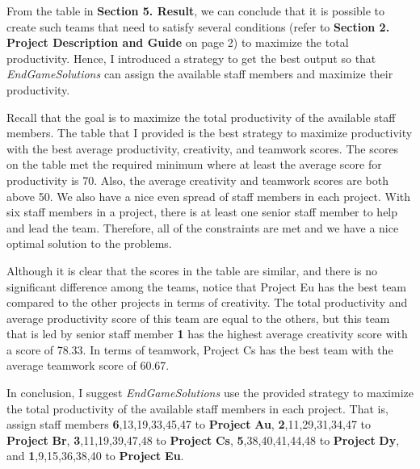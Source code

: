 \documentclass{article}
\begin{document}
From the table in \textbf{Section 5. Result}, we can conclude that it is possible to create such teams that need to satisfy several conditions (refer to \textbf{Section 2. Project Description and Guide} on page 2) to maximize the total productivity. Hence, I introduced a strategy to get the best output so that \textit{EndGameSolutions} can assign the available staff members and maximize their productivity.

Recall that the goal is to maximize the total productivity of the available staff members. The table that I provided is the best strategy to maximize productivity with the best average productivity, creativity, and teamwork scores. The scores on the table met the required minimum where at least the average score for productivity is 70. Also, the average creativity and teamwork scores are both above 50. We also have a nice even spread of staff members in each project. With six staff members in a project, there is at least one senior staff member to help and lead the team. Therefore, all of the constraints are met and we have a nice optimal solution to the problems.

Although it is clear that the scores in the table are similar, and there is no significant difference among the teams, notice that Project Eu has the best team compared to the other projects in terms of creativity. The total productivity and average productivity score of this team are equal to the others, but this team that is led by senior staff member \textbf{1} has the highest average creativity score with a score of 78.33. In terms of teamwork, Project Cs has the best team with the average teamwork score of 60.67.

In conclusion, I suggest \textit{EndGameSolutions} use the provided strategy to maximize the total productivity of the available staff members in each project. That is, assign staff members \textbf{6},13,19,33,45,47 to \textbf{Project} \textbf{Au}, \textbf{2},11,29,31,34,47 to \textbf{Project} \textbf{Br}, \textbf{3},11,19,39,47,48 to \textbf{Project} \textbf{Cs}, \textbf{5},38,40,41,44,48 to \textbf{Project} \textbf{Dy}, and \textbf{1},9,15,36,38,40 to \textbf{Project} \textbf{Eu}.
\end{document}
